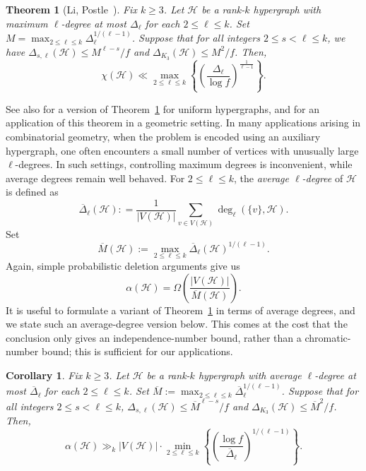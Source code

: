 \documentclass[11pt,oneside]{amsart}
\numberwithin{exercise}{subsection}
\newtheorem{theorem}{Theorem}
\newtheorem{cor}{Corollary}
\begin{document}
\begin{theorem}[Li, Postle~\cite{LiPostle}]
\label{thm:LiPostle}
Fix \( k \geq 3 \). Let $\mathcal{H}$ be a rank-$k$ hypergraph with maximum $\ell$-degree at most $\Delta_\ell$ for each $2\leq \ell \leq k$. Set $M=\max_{2 \leq \ell \leq k}
\Delta_\ell^{1/(\ell - 1)}$.
Suppose that for all integers \( 2 \leq s < \ell \leq k \), we have $\Delta_{s, \ell}(\mathcal{H}) \leq M^{\ell - s} / f$ and
$\Delta_{K_3}(\mathcal{H}) \leq M^2 / f$. Then,
\[
\chi(\mathcal{H}) \ll 
\max_{2 \leq \ell \leq k} 
\left\{
\left( \frac{\Delta_\ell}{\log f} \right)^{\frac{1}{\ell - 1}}
\right\}.
\]
\end{theorem}
See also \cite{cooper2016coloring} for a version of Theorem~\ref{thm:LiPostle} for uniform hypergraphs, and \cite{clemen2026applications} for an application of this theorem in a geometric setting.
In many applications arising in combinatorial geometry, when the problem is encoded using an auxiliary hypergraph, one often encounters a small number of vertices with unusually large $\ell$-degrees. In such settings, controlling maximum degrees is inconvenient, while average degrees remain well behaved. For \( 2 \leq \ell \leq k \), the \emph{average \( \ell \)-degree} of \( \mathcal{H} \) is defined as
\[
\overline{\Delta}_\ell(\mathcal{H}):
=
\frac{1}{|V(\mathcal{H})|}
\sum_{v \in V(\mathcal{H})} \deg_\ell(\{v\}, \mathcal{H}).
\]
Set
\[
\overline{M}(\mathcal H)
:=
\max_{2 \leq \ell \leq k}
\overline{\Delta}_\ell(\mathcal H)^{1/(\ell - 1)}.
\]
Again, simple probabilistic deletion arguments give us
\begin{equation*}
\alpha(\mathcal{H})
=
\Omega\!\left(
\frac{|V(\mathcal{H})|}{\overline M(\mathcal{H})}
\right).
\end{equation*}
It is useful to formulate a variant of Theorem~\ref{thm:LiPostle} in terms of average degrees, and we state such an average-degree version below. This comes at the cost that the conclusion only gives an independence-number
bound, rather than a chromatic-number bound; this is sufficient for our
applications.

\begin{cor}
\label{corl:ind}
Fix \( k \geq 3 \). Let $\mathcal{H}$ be a rank-$k$ hypergraph with average $\ell$-degree at most $\overline{\Delta}_\ell$ for each $2\leq \ell \leq k$. Set $\overline{M}:=\max_{2 \leq \ell \leq k}
\overline{\Delta}_\ell^{1/(\ell - 1)}$.
Suppose that for all integers \( 2 \leq s < \ell \leq k \), $\Delta_{s, \ell}(\mathcal{H}) \leq \overline{M}^{\ell - s} / f$ and $\Delta_{K_3}(\mathcal{H}) \leq \overline{M}^2 / f$.
Then,
\[
\alpha(\mathcal{H})
\gg_k
|V(\mathcal{H})| \cdot
\min_{2 \leq \ell \leq k}
\left\{
\left(
\frac{\log f}{\overline{\Delta}_\ell}
\right)^{1/(\ell - 1)}
\right\}.
\]
\end{cor}
\end{document}

